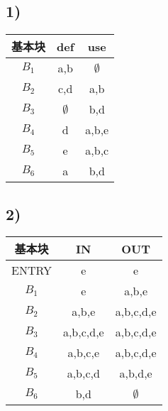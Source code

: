 \documentclass[11pt]{article}
\begin{document}
\subsection*{1)}
\begin{table}[H]
\centering
\begin{tabular}{|c|c|c|}
	\hline
	\textbf{基本块} & \textbf{def} & \textbf{use} \\ \hline
	$B_1$ & a,b & $\emptyset$ \\ \hline
	$B_2$ & c,d & a,b \\ \hline
	$B_3$ & $\emptyset$ & b,d \\ \hline
	$B_4$ & d & a,b,e \\ \hline
	$B_5$ & e & a,b,c \\ \hline
	$B_6$ & a & b,d \\ \hline
\end{tabular}
\end{table}
\subsection*{2)}
\begin{table}[H]
\centering
\begin{tabular}{|c|c|c|}
	\hline
	\textbf{基本块} & \textbf{IN} & \textbf{OUT} \\ \hline
	ENTRY & e & e  \\ \hline
	$B_1$ & e & a,b,e \\ \hline
	$B_2$ & a,b,e & a,b,c,d,e \\ \hline
	$B_3$ & a,b,c,d,e & a,b,c,d,e \\ \hline
	$B_4$ & a,b,c,e & a,b,c,d,e \\ \hline
	$B_5$ & a,b,c,d & a,b,d,e \\ \hline
	$B_6$ & b,d & $\emptyset$ \\ \hline
\end{tabular}
\end{table}
\end{document}
